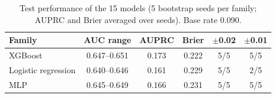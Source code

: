 \begin{table}[t]
\centering
\caption{Test performance of the 15 models (5 bootstrap seeds per family; AUPRC and Brier averaged over seeds). Base rate 0.090.}
\label{tab:models}
\footnotesize
\setlength{\tabcolsep}{3pt}
\begin{tabular}{lccccc}
\toprule
Family & AUC range & AUPRC & Brier & $\pm$0.02 & $\pm$0.01 \\
\midrule
XGBoost & 0.647--0.651 & 0.173 & 0.222 & 5/5 & 5/5 \\
Logistic regression & 0.640--0.646 & 0.161 & 0.229 & 5/5 & 2/5 \\
MLP & 0.645--0.649 & 0.166 & 0.231 & 5/5 & 5/5 \\
\bottomrule
\end{tabular}
\end{table}
